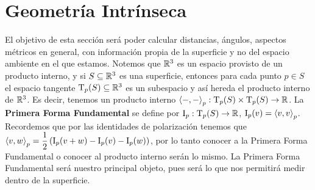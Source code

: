 \section{Geometría Intrínseca}

El objetivo de esta sección será poder calcular distancias, ángulos, aspectos métricos en general, con información propia de la superficie y no del espacio ambiente en el que estamos. Notemos que $\mathbb{R}^3$ es un espacio provisto de un producto interno, y si $S\subseteq\mathbb{R}^3$ es una superficie, entonces para cada punto $p\in S$ el espacio tangente $\mathrm{T}_p(S)\subseteq\mathbb{R}^3$ es un subespacio y así hereda el producto interno de $\mathbb{R}^3$. Es decir, tenemos un producto interno $\left\langle -,- \right\rangle_p:\mathrm{T}_p(S)\times\mathrm{T}_p(S)\to\mathbb{R}$. La \textbf{Primera Forma Fundamental} se define por $\mathrm{I}_p:\mathrm{T}_p(S)\to\mathbb{R}$, $\mathrm{I}_p(v)=\left\langle v,v \right\rangle_p$. Recordemos que por las identidades de polarización tenemos que $\left\langle v,w \right\rangle_p = \dfrac{1}{2}\left(\mathrm{I}_p(v+w)-\mathrm{I}_p(v)-\mathrm{I}_p(w) \right)$, por lo tanto conocer a la Primera Forma Fundamental o conocer al producto interno serán lo mismo. La Primera Forma Fundamental será nuestro principal objeto, pues será lo que nos permitirá medir dentro de la superficie.

